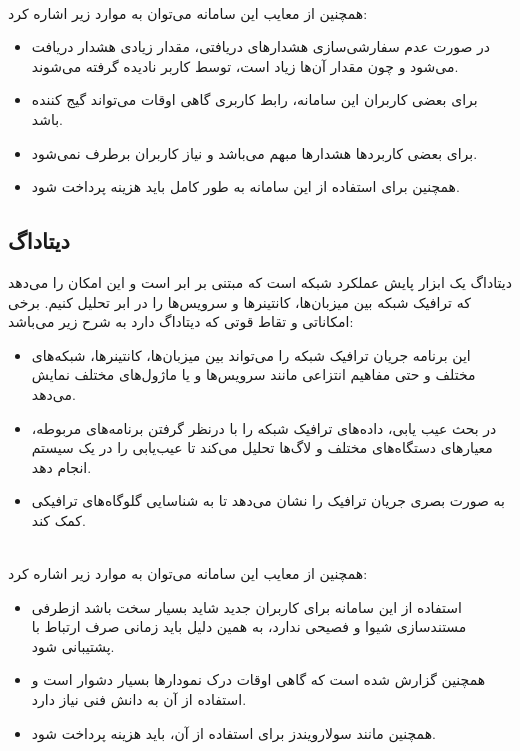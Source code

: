 \newpage
\\
همچنین از معایب این سامانه می‌توان به موارد زیر اشاره کرد:

\begin{itemize}
    \item در صورت عدم سفارشی‌سازی هشدارهای دریافتی، مقدار زیادی هشدار دریافت می‌شود و چون مقدار آن‌ها زیاد است، توسط کاربر نادیده گرفته می‌شوند.
    \item برای بعضی کاربران این سامانه، رابط کاربری گاهی اوقات می‌تواند گیج کننده باشد.
    \item برای بعضی کاربردها هشدارها مبهم می‌باشد و نیاز کاربران برطرف نمی‌شود.
    \item همچنین برای استفاده از این سامانه به طور کامل باید هزینه پرداخت شود.
\end{itemize}


\subsection{دیتاداگ}

دیتاداگ یک ابزار پایش عملکرد شبکه است که مبتنی بر ابر است و این امکان را می‌دهد که ترافیک شبکه بین میزبان‌ها، کانتینرها و سرویس‌ها را در ابر تحلیل کنیم. برخی امکاناتی و تقاط قوتی که دیتاداگ دارد به شرح زیر می‌باشد:

\begin{itemize}
    \item این برنامه جریان ترافیک شبکه را می‌تواند بین میزبان‌ها، کانتینرها، شبکه‌های مختلف و حتی مفاهیم انتزاعی مانند سرویس‌ها و یا ماژول‌های مختلف نمایش می‌دهد. 
    \item در بحث عیب یابی، داده‌های ترافیک شبکه را با درنظر گرفتن برنامه‌های مربوطه، معیارهای دستگاه‌های مختلف و لاگ‌ها تحلیل می‌کند تا عیب‌یابی را در یک سیستم انجام دهد.
    \item به صورت بصری جریان ترافیک را نشان می‌دهد تا به شناسایی گلوگاه‌های ترافیکی کمک کند.
\end{itemize}
\\
همچنین از معایب این سامانه می‌توان به موارد زیر اشاره کرد:


\begin{itemize}
    \item استفاده از این سامانه برای کاربران جدید شاید بسیار سخت باشد ازطرفی مستندسازی شیوا و فصیحی ندارد، به همین دلیل باید زمانی صرف ارتباط با پشتیبانی شود.
    \item همچنین گزارش شده است که گاهی اوقات درک نمودارها بسیار دشوار است و استفاده از آن به دانش فنی نیاز دارد.
    \item همچنین مانند سولارویندز برای استفاده از آن، باید هزینه پرداخت شود.
\end{itemize}



